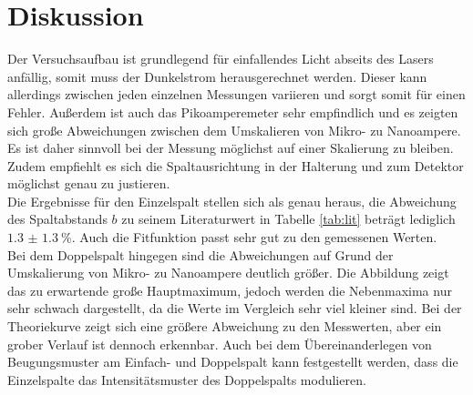 \section{Diskussion}

Der Versuchsaufbau ist grundlegend für einfallendes Licht abseits des Lasers anfällig, somit muss der Dunkelstrom herausgerechnet werden. Dieser kann allerdings zwischen jeden einzelnen
Messungen variieren und sorgt somit für einen Fehler. Außerdem ist auch das Pikoamperemeter sehr empfindlich und es zeigten sich große Abweichungen zwischen dem Umskalieren von Mikro- zu Nanoampere. Es ist daher sinnvoll bei der Messung möglichst
auf einer Skalierung zu bleiben. Zudem empfiehlt es sich die Spaltausrichtung in der Halterung und zum Detektor möglichst genau zu justieren.
\\
Die Ergebnisse für den Einzelspalt stellen sich als genau heraus, die Abweichung des Spaltabstands $b$ zu seinem Literaturwert in Tabelle \ref{tab:lit} beträgt lediglich $\SI{1.3(13)}{\percent}$. Auch die Fitfunktion passt sehr gut zu den
gemessenen Werten.
\\
\newline
Bei dem Doppelspalt hingegen sind die Abweichungen auf Grund der Umskalierung von Mikro- zu Nanoampere deutlich größer. Die Abbildung zeigt das zu erwartende große Hauptmaximum, jedoch werden die Nebenmaxima nur sehr schwach dargestellt, da die 
Werte im Vergleich sehr viel kleiner sind. Bei der Theoriekurve zeigt sich eine größere Abweichung zu den Messwerten, aber ein grober Verlauf ist dennoch erkennbar. Auch bei dem Übereinanderlegen von Beugungsmuster am Einfach- und Doppelspalt kann festgestellt werden, dass
die Einzelspalte das Intensitätsmuster des Doppelspalts modulieren.
